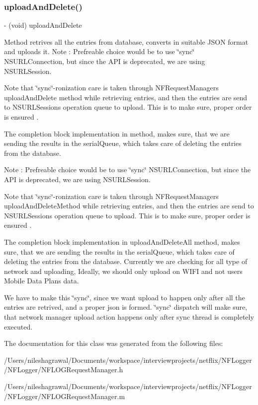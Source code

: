 \subsubsection{\texorpdfstring{upload\+And\+Delete()}{uploadAndDelete()}}
{\footnotesize\ttfamily -\/ (void) upload\+And\+Delete \begin{DoxyParamCaption}{ }\end{DoxyParamCaption}}



Method retrives all the entries from database, converts in suitable J\+S\+ON format and uploads it. Note \+: Prefreable choice would be to use \char`\"{}sync\char`\"{} N\+S\+U\+R\+L\+Connection, but since the A\+PI is deprecated, we are using N\+S\+U\+R\+L\+Session. 

Note that \char`\"{}sync\char`\"{}-\/ronization care is taken through N\+F\+Request\+Manager\textquotesingle{}s upload\+And\+Delete method while retrieving entries, and then the entries are send to N\+S\+U\+R\+L\+Session\textquotesingle{}s operation queue to upload. This is to make sure, proper order is ensured .

The completion block implementation in method, makes sure, that we are sending the results in the serial\+Queue, which takes care of deleting the entries from the database.

Note \+: Prefreable choice would be to use \char`\"{}sync\char`\"{} N\+S\+U\+R\+L\+Connection, but since the A\+PI is deprecated, we are using N\+S\+U\+R\+L\+Session.

Note that \char`\"{}sync\char`\"{}-\/ronization care is taken through N\+F\+Request\+Manager\textquotesingle{}s upload\+And\+Delete\+Method while retrieving entries, and then the entries are send to N\+S\+U\+R\+L\+Session\textquotesingle{}s operation queue to upload. This is to make sure, proper order is ensured .

The completion block implementation in upload\+And\+Delete\+All method, makes sure, that we are sending the results in the serial\+Queue, which takes care of deleting the entries from the database. Currently we are checking for all type of network and uploading, Ideally, we should only upload on W\+I\+FI and not user\textquotesingle{}s Mobile Data Plan\textquotesingle{}s data.

We have to make this \char`\"{}sync\char`\"{}, since we want upload to happen only after all the entries are retrived, and a proper json is formed. \char`\"{}sync\char`\"{} dispatch will make sure, that network manager upload action happens only after sync thread is completely executed.

The documentation for this class was generated from the following files\+:\begin{DoxyCompactItemize}
\item 
/\+Users/nileshagrawal/\+Documents/workspace/interviewprojects/netflix/\+N\+F\+Logger/\+N\+F\+Logger/N\+F\+L\+O\+G\+Request\+Manager.\+h\item 
/\+Users/nileshagrawal/\+Documents/workspace/interviewprojects/netflix/\+N\+F\+Logger/\+N\+F\+Logger/N\+F\+L\+O\+G\+Request\+Manager.\+m\end{DoxyCompactItemize}
